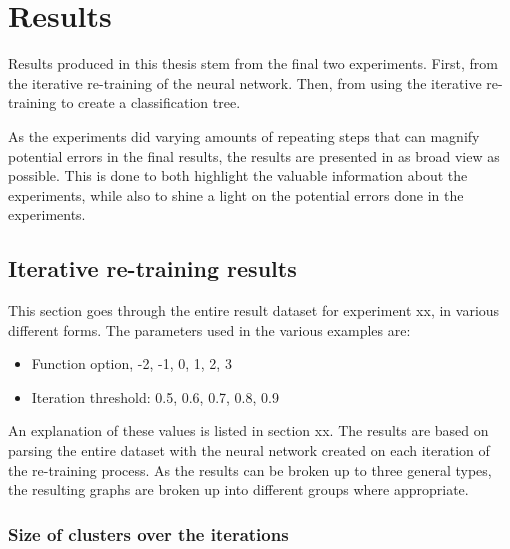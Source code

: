 \chapter{Results}


Results produced in this thesis stem from the final two experiments.
First, from the iterative re-training of the neural network.
Then, from using the iterative re-training to create a classification tree.

As the experiments did varying amounts of repeating steps that can magnify potential errors in the final results, the results are presented in as broad view as possible.
This is done to both highlight the valuable information about the experiments, while also to shine a light on the potential errors done in the experiments.

\section{Iterative re-training results}
This section goes through the entire result dataset for experiment xx, in various different forms.
The parameters used in the various examples are:

\begin{itemize}
    \item Function option, -2, -1, 0, 1, 2, 3
    \item Iteration threshold: 0.5, 0.6, 0.7, 0.8, 0.9
\end{itemize}{}
An explanation of these values is listed in section xx.
The results are based on parsing the entire dataset with the neural network created on each iteration of the re-training process.
As the results can be broken up to three general types, the resulting graphs are broken up into different groups where appropriate.

\subsection{Size of clusters over the iterations}


